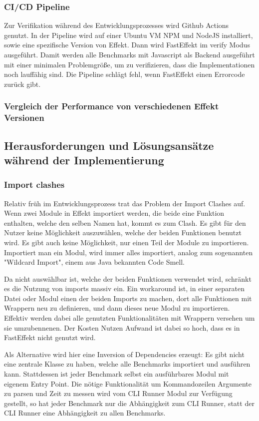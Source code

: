 \subsubsection{CI/CD Pipeline }

Zur Verifikation während des Entwicklungsprozesses wird Github Actions genutzt. In der Pipeline wird auf einer Ubuntu VM 
NPM und NodeJS installiert, sowie eine spezifische Version von Effekt. Dann wird FastEffekt im verify Modus ausgeführt. 
Damit werden alle Benchmarks mit Javascript als Backend ausgeführt mit einer minimalen Problemgröße, um zu verifizieren, dass die Implementationen noch lauffähig sind.
Die Pipeline schlägt fehl, wenn FastEffekt einen Errorcode zurück gibt.

\subsubsection{ Vergleich der Performance von verschiedenen Effekt Versionen }
 

\subsection{Herausforderungen und Lösungsansätze während der Implementierung}

\subsubsection{Import clashes}
Relativ früh im Entwicklungsprozess trat das Problem der Import Clashes auf. Wenn zwei Module in Effekt importiert werden,
die beide eine Funktion enthalten, welche den selben Namen hat, kommt es zum Clash. Es gibt für den Nutzer keine Möglichkeit 
auszuwählen, welche der beiden Funktionen benutzt wird. Es gibt auch keine Möglichkeit, nur einen Teil der Module zu importieren.
Importiert man ein Modul, wird immer alles importiert, analog zum sogenannten "Wildcard Import", einem aus Java bekannten Code Smell.

Da nicht auswählbar ist, welche der beiden Funktionen verwendet wird, schränkt es die Nutzung von imports massiv ein. Ein workaround ist, in einer
separaten Datei oder Modul einen der beiden Imports zu machen, dort alle Funktionen mit Wrappern neu zu definieren, und dann dieses neue Modul zu importieren.
Effektiv werden dabei alle genutzten Funktionalitäten mit Wrappern versehen um sie umzubennenen. Der Kosten Nutzen Aufwand ist dabei so hoch, dass es in FastEffekt nicht genutzt wird.

Als Alternative wird hier eine Inversion of Dependencies erzeugt: Es gibt nicht eine zentrale Klasse zu haben, welche alle Benchmarks importiert und ausführen kann.
Stattdessen ist jeder Benchmark selbst ein ausführbares Modul mit eigenem Entry Point. Die nötige Funktionalität um Kommandozeilen Argumente zu parsen und Zeit zu messen wird vom
CLI Runner Modul zur Verfügung gestellt, so hat jeder Benchmark nur die Abhängigkeit zum CLI Runner, statt der CLI Runner eine Abhängigkeit zu allen Benchmarks.

